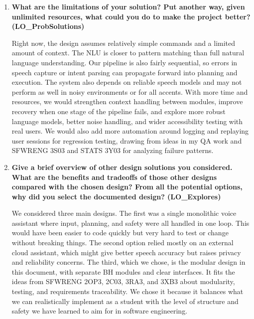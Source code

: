 \documentclass[12pt, titlepage]{article}
\begin{document}
\begin{enumerate}
While writing the MIS, I noticed that some requirements in the SRS
were too vague to map cleanly to modules. We will refine a few of them to
have clearer success conditions (for example, accuracy targets and
timing bounds), so they matched the behaviour of BH-Input and
BH-Feedback. The Hazard Analysis also needs change: some risks originally
assigned to ``the system'' were moved specifically to BH-Safety, since
that is where confirmation and blocking actually happen. The VnV
Plan needs change to add module-level tests for voice accuracy, plan
execution success, and safety prompts, reflecting what I learned
about test design in my QA co-op and SFWRENG 3S03 (Software testing).

\item \textbf{What are the limitations of your solution? Put another way,
given unlimited resources, what could you do to make the project
better? (LO\_ProbSolutions)}

Right now, the design assumes relatively simple commands and a
limited amount of context. The NLU is closer to pattern matching
than full natural language understanding. Our pipeline is also fairly
sequential, so errors in speech capture or intent parsing can propagate
forward into planning and execution. The system also depends on
reliable speech models and may not perform as well in noisy
environments or for all accents. With more time and resources, we
would strengthen context handling between modules, improve recovery
when one stage of the pipeline fails, and explore more robust language
models, better noise handling, and wider accessibility testing with real users.
We would also add more automation around logging and replaying user sessions for
regression testing, drawing from ideas in my QA work and SFWRENG 3S03 and
STATS 3Y03 for analyzing failure patterns.

\item \textbf{Give a brief overview of other design solutions you
considered. What are the benefits and tradeoffs of those other
designs compared with the chosen design? From all the potential
options, why did you select the documented design? (LO\_Explores)}

We considered three main designs. The first was a single monolithic
voice assistant where input, planning, and safety were all handled in
one loop. This would have been easier to code quickly but very hard
to test or change without breaking things. The second option relied
mostly on an external cloud assistant, which might give better
speech accuracy but raises privacy and reliability concerns. The
third, which we chose, is the modular design in this document, with
separate BH modules and clear interfaces. It fits the ideas from
SFWRENG 2OP3, 2C03, 3RA3, and 3XB3 about modularity, testing, and
requirements traceability. We chose it because it balances what we can
realistically implement as a student with the level of structure and
safety we have learned to aim for in software engineering.
\end{enumerate}
\end{document}
